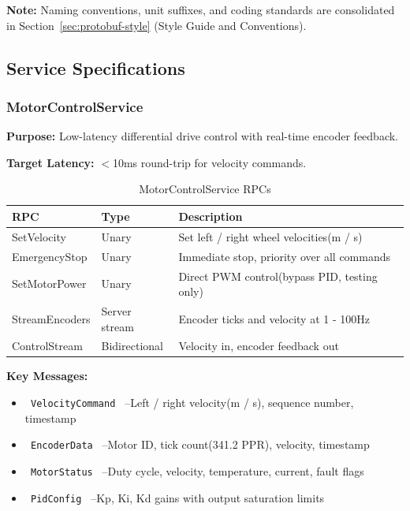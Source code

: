\textbf{Note:} Naming conventions, unit suffixes, and coding standards are consolidated in Section~\ref{sec:protobuf-style} (Style Guide and Conventions).

\subsection{Service Specifications}
\label{sec:service-specifications}

\subsubsection{MotorControlService}

\textbf{Purpose:} Low-latency differential drive control with real-time encoder feedback.

\textbf{Target Latency:} $<$10ms round-trip for velocity commands.

\begin{table}[H]
\centering
\caption{MotorControlService RPCs}
\label{tab:motor-rpcs}
\begin{tabular} { | l | l | p{6cm} |}
\hline
\textbf{RPC} & \textbf{Type} & \textbf{Description}
\\
\hline SetVelocity &Unary &Set left /
    right wheel velocities(m / s) \\
EmergencyStop &Unary &Immediate stop,
    priority over all commands \\
SetMotorPower &Unary &Direct PWM
        control(bypass PID, testing only) \\
StreamEncoders &Server
        stream &Encoder ticks and velocity at 1 -
        100Hz \\
ControlStream &Bidirectional &Velocity in,
    encoder feedback out \\
\hline
\end{tabular}
\end{table}

\textbf{Key Messages:}
\begin{itemize}[leftmargin = 1.5em, topsep = 4pt, itemsep = 2pt]
    \item \texttt {
  VelocityCommand
}
--Left / right velocity(m / s), sequence number, timestamp
    \item \texttt {
  EncoderData
}
--Motor ID, tick count(341.2 PPR), velocity, timestamp
    \item \texttt {
  MotorStatus
}
--Duty cycle, velocity, temperature, current, fault flags
    \item \texttt {
  PidConfig
}
--Kp, Ki, Kd gains with output saturation limits
\end{itemize}

